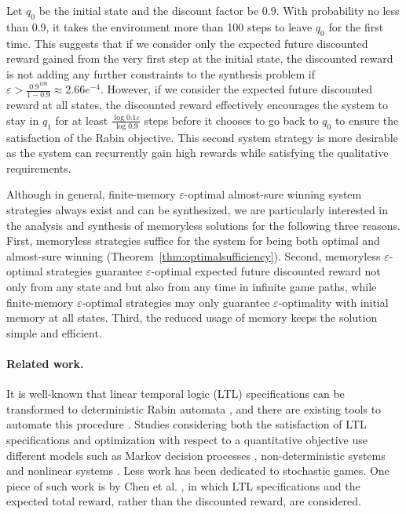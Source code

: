 \documentclass[runningheads,a4paper]{llncs}
\begin{document}
Let $q_0$ be the initial state and the discount factor be $0.9$. With probability no less than 0.9, it takes the environment more than 100 steps to leave $q_0$ for the first time. This suggests that if we consider only the expected future discounted reward gained from the very first step at the initial state, the discounted reward is not adding any further constraints to the synthesis problem if $\varepsilon > \frac{0.9^{100}}{1-0.9} \approx 2.66e^{-4}$. However, if we consider the expected future discounted reward at all states, the discounted reward effectively encourages the system to stay in $q_1$ for at least $\frac{\log 0.1 \varepsilon}{\log 0.9}$ steps before it chooses to go back to $q_0$ to ensure the satisfaction of the Rabin objective. This second system strategy is more desirable as the system can recurrently gain high rewards while satisfying the qualitative requirements. 

Although in general, finite-memory $\varepsilon$-optimal almost-sure winning system strategies always exist and can be synthesized, we are particularly interested in the analysis and synthesis of memoryless solutions for the following three reasons. First, memoryless strategies suffice for the system for being both optimal and almost-sure winning (Theorem~\ref{thm:optimalsufficiency}). Second, memoryless $\varepsilon$-optimal strategies guarantee $\varepsilon$-optimal expected future discounted reward not only from any state and but also from any time in infinite game paths, while finite-memory $\varepsilon$-optimal strategies may only guarantee $\varepsilon$-optimality with initial memory at all states. Third, the reduced usage of memory keeps the solution simple and efficient.











\paragraph{Related work.} 
It is well-known that linear temporal logic (LTL) specifications can be transformed to deterministic Rabin automata \cite{babiak2013effective}, and there are existing tools to automate this procedure \cite{klein2005linear, gaiser2012rabinizer,  blahoudek2015ltl3dra, klein2015ltl2dstar}. Studies considering both the satisfaction of LTL specifications and optimization with respect to a quantitative objective use different models such as Markov decision processes \cite{wolff2012optimal, ding2014optimal}, non-deterministic systems \cite{wolff2013optimal} and nonlinear systems \cite{wolff2013nonlinear}. Less work has been dedicated to stochastic games. One piece of such work is by Chen et al. \cite{chen2013synthesis}, in which LTL specifications and the expected total reward, rather than the discounted reward, are considered. 
\end{document}
